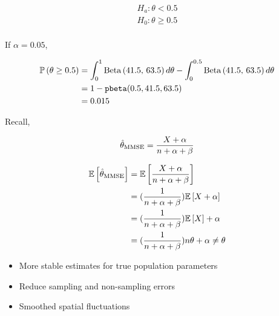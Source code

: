 \documentclass[12pt]{article}
\begin{document}
\begin{enumerate}
\begin{align*}
   H_a : \theta < 0.5 \\
   H_0 : \theta \geq 0.5 \\ 
\end{align*}

If $\alpha = 0.05$,

\begin{align*}
    \mathbb{P}\left(\theta \geq 0.5\right) &= \int_0^1 \mathrm{Beta}\left(41.5,\,63.5\right)d\theta - \int_0^{0.5} \mathrm{Beta}\left(41.5,\,63.5\right)d\theta \\
    &= 1 - \texttt{pbeta}(0.5, 41.5, 63.5) \\ 
    &= 0.015
\end{align*}



Recall,

\begin{align*}
    \hat{\theta}_{\mathrm{MMSE}} = \frac{X + \alpha}{n + \alpha + \beta} 
\end{align*}

\begin{align*}
    \mathbb{E}\left[\hat{\theta}_{\mathrm{MMSE}}\right] &= \mathbb{E}\left[\frac{X + \alpha}{n + \alpha + \beta}\right] \\
        &= (\frac{1}{n+\alpha+\beta})\mathbb{E}\left[X + \alpha\right] \\
        &= (\frac{1}{n+\alpha+\beta})\mathbb{E}\left[X\right] + \alpha \\
        &= (\frac{1}{n+\alpha+\beta})n\theta + \alpha \neq \theta
\end{align*} 



\begin{itemize}
    \item More stable estimates for true population parameters
    \item Reduce sampling and non-sampling errors
    \item Smoothed spatial fluctuations
\end{itemize}


\end{enumerate}
\end{document}
